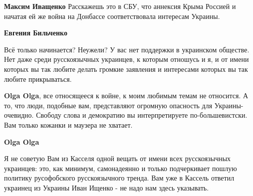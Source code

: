 \begin{itemize}
\begin{itemize}
 
\textbf{Максим Иващенко} Расскажешь это в СБУ, что аннексия Крыма Россией и начатая ей же война на Донбассе соответствовала интересам Украины.🤣

 
\textbf{Евгения Бильченко} 

Всё только начинается? Неужели? У вас нет поддержки в украинском обществе. Нет
даже среди русскоязычных украинцев, к которым отношусь и я, и от имени которых
вы так любите делать громкие заявления и интересами которых вы так любите
прикрываться.

 
\textbf{Olga Olga}, все относящееся к войне, к моим любимым темам не относится.
А то, что люди, подобные вам, представляют огромную опасность для
Украины-очевидно. Свободу слова и демократию вы интерпретируете
по-большевистски. Вам только кожанки и маузера не хватает.


 
\textbf{Olga Olga} 

Я не советую Вам из Касселя одной вещать от имени всех русскоязычных украинцев:
это, как минимум, самонадеянно и только подчеркивает пошлую политику
русофобского русскоязычного тренда. Вам уже в Кассель ответил украинец из
Украины Иван Ищенко - не надо нам здесь указывать.
\end{itemize}

\end{itemize}

